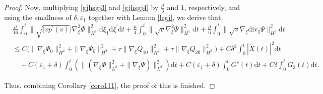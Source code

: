\documentclass[10pt,a4paper]{amsart}
\newcommand{\ddiv}{\mathrm{div}}
\newcommand{\dif}{\mathrm{d}}
\begin{document}
\begin{proof}
Now, multiplying \eqref{gjhsgj3} and \eqref{gjhsgj4} by $\frac{\mu}{6}$ and $1$, respectively, and using the smallness of $\delta, \varepsilon_1$ together with Lemma \ref{legj}, we derive that
\begin{equation}\label{gjhsgj6}
\begin{aligned}
&\frac{\mu}{16}\int_0^t\|\sqrt{|vp^\prime(v)}|\nabla_\xi^2\Phi\|_{H^1}^2
\dif \xi_1\dif \xi^{\prime}\dif t
+\frac{\mu}{4}\int_0^t\|\sqrt{v}\nabla^2_\xi\Psi\|_{H^1}^2\dif t
+\frac{\mu}{6}\int_0^t\|
\sqrt{v}\nabla_\xi\ddiv_\xi\Psi\|_{H^1}^2
\dif t\\
&\le C\Big(\|\nabla_\xi\Phi_0\|_{H^2}^2+\|\nabla_\xi\Psi_0\|_{H^2}^2
+\tau\|\nabla_\xi Q_{10}\|_{H^2}^2
+\tau\|\nabla_\xi Q_{20}\|_{H^2}^2\Big)+C\delta^2\int_0^t|\dot X(t)|^2\dif t\\
&\quad+C(\varepsilon_1+\delta)\int_0^t
\left(\|\left(\nabla_\xi\Phi\|_{L^2}^2+\| \nabla_\xi\Psi\right)\|_{L^2}^2
\right)
\dif t
+C(\varepsilon_1+\delta)\int_0^t
G^s(t)
\dif t
+C\delta\int_0^t
G_3(t)
\dif t.
\end{aligned}
\end{equation}

Thus, combining Corollary \ref{coro111}, the proof of this is finished.
\end{proof}
\end{document}
